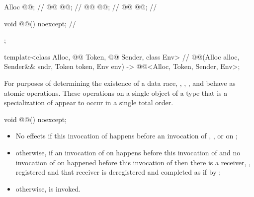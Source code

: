 \begin{codeblock}
{{    Alloc @@;                                                            // \expos
    @@ @@;                                                      // \expos
    @@ @@;                                                                // \expos
    @@ @@;                                                          // \expos

    void @@() noexcept;                                                // \expos
  };

  template<class Alloc, @@ Token, @@ Sender, class Env>        // \expos
    @@(Alloc alloc, Sender&& sndr, Token token, Env env)
      -> @@<Alloc, Token, Sender, Env>;
}
\end{codeblock}

\pnum
For purposes of determining the existence of a data race,
, , , and 
behave as atomic operations.
These operations on a single object of a type
that is a specialization of 
appear to occur in a single total order.

%
\begin{itemdecl}
void @@() noexcept;
\end{itemdecl}

\begin{itemdescr}
\pnum
\effects
\begin{itemize}
\item
No effects if this invocation of  happens before
an invocation of
, , or 
on ;
\item
otherwise,
if an invocation of  on  happens before
this invocation of  and
no invocation of  on  happened before
this invocation of  then
there is a receiver, , registered and
that receiver is deregistered and completed
as if by ;
\item
otherwise,
 is invoked.
\end{itemize}
\end{itemdescr}

